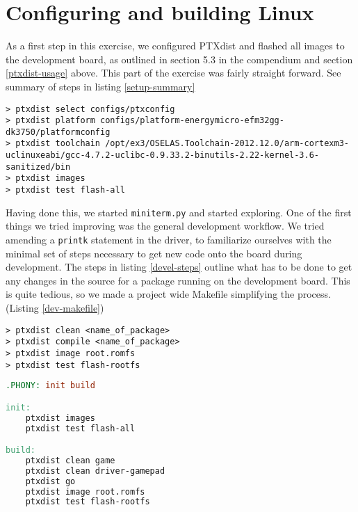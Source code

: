 \section{Configuring and building Linux}

As a first step in this exercise, we configured PTXdist and flashed all images to the development board, as outlined in section 5.3 in the compendium \cite[p.~47]{compendium} and section \ref{ptxdist-usage} above. This part of the exercise was fairly straight forward. See summary of steps in listing \ref{setup-summary}

\begin{lstlisting}[label=setup-summary, caption=Setup summary]
> ptxdist select configs/ptxconfig
> ptxdist platform configs/platform-energymicro-efm32gg-dk3750/platformconfig
> ptxdist toolchain /opt/ex3/OSELAS.Toolchain-2012.12.0/arm-cortexm3-uclinuxeabi/gcc-4.7.2-uclibc-0.9.33.2-binutils-2.22-kernel-3.6-sanitized/bin
> ptxdist images
> ptxdist test flash-all
\end{lstlisting}

Having done this, we started \texttt{miniterm.py} and started exploring. One of the first things we tried improving was the general development workflow. 
We tried amending a \texttt{printk} statement in the driver, to familiarize ourselves with the minimal set of steps necessary to get new code onto the board during development. 
The steps in listing \ref{devel-steps} outline what has to be done to get any changes in the source for a package running on the development board. This is quite tedious, so we made a project wide Makefile simplifying the process. (Listing \ref{dev-makefile})

\begin{lstlisting}[label=devel-steps, caption=Development steps]
> ptxdist clean <name_of_package>
> ptxdist compile <name_of_package>
> ptxdist image root.romfs
> ptxdist test flash-rootfs
\end{lstlisting}

\begin{lstlisting}[language=make, label=dev-makefile, caption=Development Makefile]
.PHONY: init build

init:
    ptxdist images
    ptxdist test flash-all

build:
    ptxdist clean game
    ptxdist clean driver-gamepad
    ptxdist go
    ptxdist image root.romfs
    ptxdist test flash-rootfs
\end{lstlisting}
